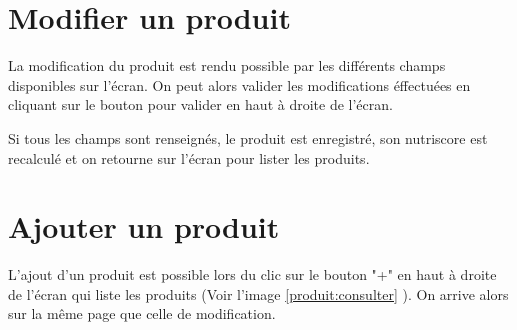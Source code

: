 \documentclass[report]{BetterDocument}
\begin{document}
	\section{Modifier un produit}

	La modification du produit est rendu possible par les différents champs disponibles sur l'écran. On peut alors valider les modifications éffectuées en cliquant sur le bouton pour valider en haut à droite de l'écran.

	Si tous les champs sont renseignés, le produit est enregistré, son nutriscore est recalculé et on retourne sur l'écran pour lister les produits.

	\section{Ajouter un produit}

	L'ajout d'un produit est possible lors du clic sur le bouton "+" en haut à droite de l'écran qui liste les produits (Voir l'image \ref{produit:consulter} ). On arrive alors sur la même page que celle de modification.
\end{document}
